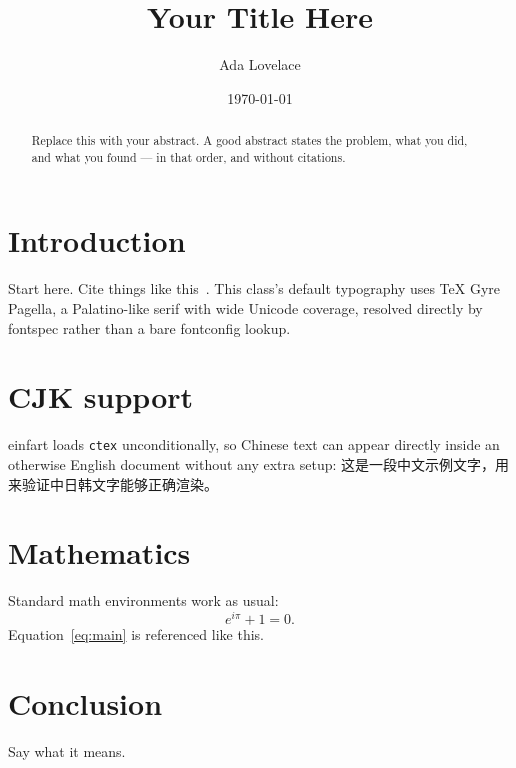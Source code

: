 \documentclass{einfart}
\title{Your Title Here}
\author{Ada Lovelace}
\date{\today}
\begin{document}
\maketitle

\begin{abstract}
Replace this with your abstract. A good abstract states the problem, what
you did, and what you found --- in that order, and without citations.
\end{abstract}

\section{Introduction}
Start here. Cite things like this~\cite{knuth1984texbook}. This class's
default typography uses TeX Gyre Pagella, a Palatino-like serif with wide
Unicode coverage, resolved directly by fontspec rather than a bare
fontconfig lookup.

\section{CJK support}
\label{sec:cjk}
einfart loads \texttt{ctex} unconditionally, so Chinese text can appear
directly inside an otherwise English document without any extra setup:
这是一段中文示例文字，用来验证中日韩文字能够正确渲染。

\section{Mathematics}
\label{sec:math}
Standard math environments work as usual:
\begin{equation}
  \label{eq:main}
  e^{i\pi} + 1 = 0.
\end{equation}
Equation~\eqref{eq:main} is referenced like this.

\section{Conclusion}
Say what it means.



\end{document}
